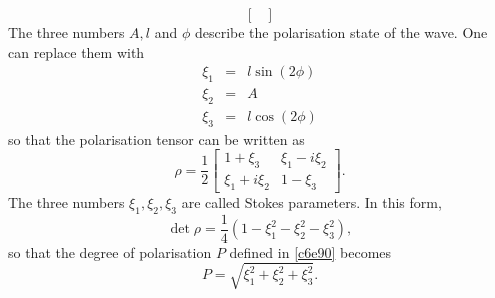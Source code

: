 \begin{enumerate}
\begin{equation}
\begin{bmatrix}
\end{bmatrix}
\end{equation}
The three numbers $A, l$ and $\phi$ describe the polarisation state of the wave.
One can replace them with
\begin{eqnarray}
\xi_1 &=& l\sin(2\phi) \label{c6e104} \\
\xi_2 &=& A \label{c6e105} \\
\xi_3 &=& l\cos(2\phi) \label{c6e106}
\end{eqnarray}
so that the polarisation tensor can be written as
\begin{equation}\label{c6e107}
\rho = \frac{1}{2}\begin{bmatrix}
1 + \xi_3 & \xi_1 - i\xi_2 \\
\xi_1 + i\xi_2 & 1 - \xi_3
\end{bmatrix}.
\end{equation}
The three numbers $\xi_1, \xi_2, \xi_3$ are called Stokes parameters. In this form,
\begin{equation}\label{c6e108}
\det\rho = \frac{1}{4}(1 - \xi_1^2 - \xi_2^2 - \xi_3^2),
\end{equation}
so that the degree of polarisation $P$ defined in \eqref{c6e90} becomes
\begin{equation}\label{c6e109}
P = \sqrt{\xi_1^2 + \xi_2^2 + \xi_3^2}.
\end{equation}


\end{enumerate}
